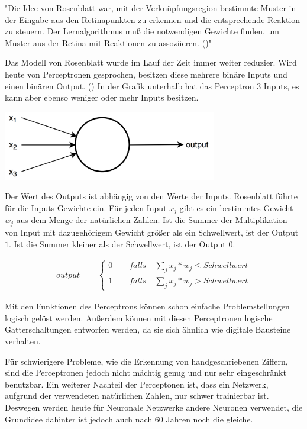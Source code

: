 \documentclass[../main.tex]{subfiles}
\begin{document}
"Die Idee von Rosenblatt war, mit der Verknüpfungsregion bestimmte Muster in der Eingabe aus den Retinapunkten zu erkennen und die entsprechende Reaktion zu steuern. Der Lernalgorithmus muß die notwendigen Gewichte finden, um Muster aus der Retina mit Reaktionen zu assoziieren. (\cite{articleTheorieDerNeuronalenNetze})"

Das Modell von Rosenblatt wurde im Lauf der Zeit immer weiter reduzier. Wird heute von Perceptronen gesprochen, besitzen diese mehrere binäre Inputs und einen binären Output. (\cite{neuralNetworksAndDeepLearning}) In der Grafik unterhalb hat das Perceptron $3$ Inputs, es kann aber ebenso weniger oder mehr Inputs besitzen.

\includegraphics[width=0.7\textwidth, center]{../images/Benz/perceptron.png}

Der Wert des Outputs ist abhängig von den Werte der Inputs. Rosenblatt führte für die Inputs Gewichte ein. Für jeden Input \(x_{j}\) gibt es ein bestimmtes Gewicht \(w_{j}\) aus dem Menge der natürlichen Zahlen. Ist die Summer der Multiplikation von Input mit dazugehörigem Gewicht größer als ein Schwellwert, ist der Output $1$. Ist die Summer kleiner als der Schwellwert, ist der Output $0$.

\begin{align}
	output &= \left \{ \begin{matrix}
	0 \qquad falls \quad \sum_{j} x_{j}*w_{j} \leq Schwellwert \\ 
	1 \qquad falls \quad \sum_{j} x_{j}*w_{j} > Schwellwert
	\end{matrix} \right.
\end{align}

Mit den Funktionen des Perceptrons können schon einfache Problemstellungen logisch gelöst werden. Außerdem können mit diesen Perceptronen logische Gatterschaltungen entworfen werden, da sie sich ähnlich wie digitale Bausteine verhalten. \cite{neuralNetworksAndDeepLearning}

Für schwierigere Probleme, wie die Erkennung von handgeschriebenen Ziffern, sind die Perceptronen jedoch nicht mächtig genug und nur sehr eingeschränkt benutzbar. Ein weiterer Nachteil der Perceptonen ist, dass ein Netzwerk, aufgrund der verwendeten natürlichen Zahlen, nur schwer trainierbar ist. Deswegen werden heute für Neuronale Netzwerke andere Neuronen verwendet, die Grundidee dahinter ist jedoch auch nach 60 Jahren noch die gleiche.
\end{document}
